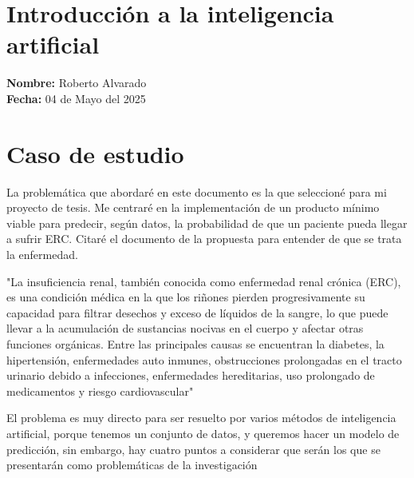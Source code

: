 \documentclass{article}
\begin{document}
\section*{\center Introducción a la inteligencia artificial}
\textbf{Nombre:} Roberto Alvarado\\
\textbf{Fecha:} 04 de Mayo del 2025
\section{ Caso de estudio }

La problemática que abordaré en este documento es la que seleccioné para
mi proyecto de tesis. Me centraré en la implementación de un producto
mínimo viable para predecir, según datos, la probabilidad de que un paciente
pueda llegar a sufrir ERC. Citaré el documento de la propuesta para entender
de que se trata la enfermedad.

\begin{adjustwidth}{1cm}{}
    "La insuficiencia renal, también conocida como enfermedad renal crónica (ERC), es
    una condición médica en la que los riñones pierden progresivamente su capacidad
    para filtrar desechos y exceso de líquidos de la sangre, lo que puede llevar a
    la acumulación de sustancias nocivas en el cuerpo y afectar otras funciones
    orgánicas. Entre las principales causas se encuentran la diabetes, la
    hipertensión, enfermedades auto inmunes, obstrucciones prolongadas en el tracto
    urinario debido a infecciones, enfermedades hereditarias, uso prolongado de
    medicamentos y riesgo cardiovascular" \cite{yu1}
\end{adjustwidth}

El problema es muy directo para ser resuelto por varios métodos de inteligencia
artificial, porque tenemos un conjunto de datos, y queremos hacer un modelo de
predicción, sin embargo, hay cuatro puntos a considerar que serán los que se
presentarán como problemáticas de la investigación
\end{document}
